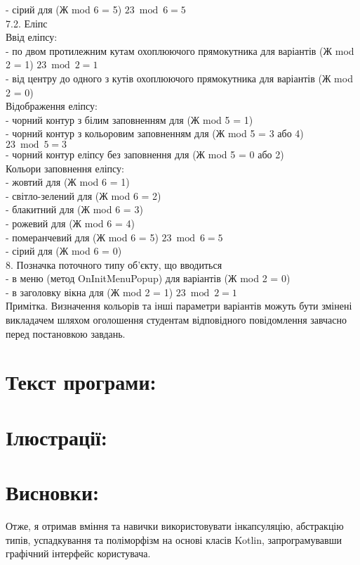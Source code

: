 \documentclass[14pt]{article}
\begin{document}
- сірий для (Ж mod 6 = 5) $ 23 \bmod 6 = 5$\\
7.2. Еліпс\\
Ввід еліпсу:\\
- по двом протилежним кутам охоплюючого прямокутника для варіантів (Ж mod 2 = 1) $ 23 \bmod 2 = 1 $\\
- від центру до одного з кутів охоплюючого прямокутника для варіантів (Ж mod 2 = 0)\\
Відображення еліпсу:\\
- чорний контур з білим заповненням для (Ж mod 5 = 1)\\
- чорний контур з кольоровим заповненням для (Ж mod 5 = 3 або 4) $ 23 \bmod 5 = 3$\\
- чорний контур еліпсу без заповнення для (Ж mod 5 = 0 або 2)\\
Кольори заповнення еліпсу:\\
- жовтий для (Ж mod 6 = 1)\\
- світло-зелений для (Ж mod 6 = 2)\\
- блакитний для (Ж mod 6 = 3)\\
- рожевий для (Ж mod 6 = 4)\\
- померанчевий для (Ж mod 6 = 5) $ 23 \bmod 6 = 5$\\
- сірий для (Ж mod 6 = 0)\\
8. Позначка поточного типу об’єкту, що вводиться\\
- в меню (метод OnInitMenuPopup) для варіантів (Ж mod 2 = 0)\\
- в заголовку вікна для (Ж mod 2 = 1) $ 23 \bmod 2 = 1$\\
Примітка. Визначення кольорів та інші параметри варіантів можуть бути змінені викладачем шляхом оголошення студентам відповідного повідомлення завчасно перед постановкою завдань.\\

\section{Текст програми:}


\section{Ілюстрації:}


\section{Висновки:}
Отже, я отримав вміння та навички використовувати інкапсуляцію, абстракцію типів, успадкування та поліморфізм на основі класів Kotlin, запрограмувавши графічний інтерфейс користувача.
\end{document}
